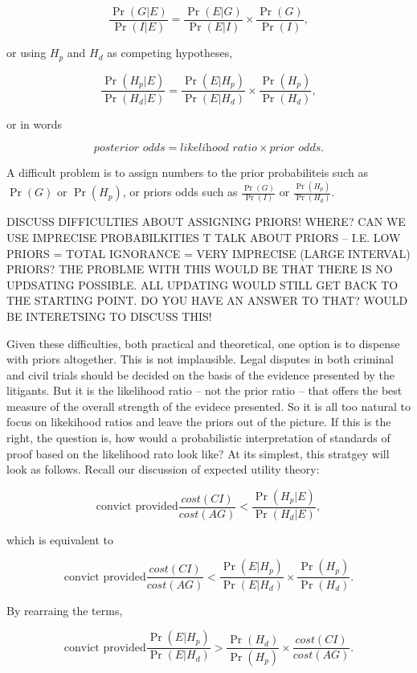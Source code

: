 \documentclass[10pt,dvipsnames,enabledeprecatedfontcommands]{scrartcl}
\begin{document}
\[ \frac{\Pr(G | E)}{\Pr(I | E)} = \frac{\Pr(E | G)}{\Pr(E | I)} \times \frac{\Pr(G)}{\Pr(I)},\]

or using \(H_p\) and \(H_d\) as competing hypotheses,

\[ \frac{\Pr(H_p | E)}{\Pr(H_d | E)} = \frac{\Pr(E | H_p)}{\Pr(E | H_d)} \times \frac{\Pr(H_p)}{\Pr(H_d)},\]

or in words

\[ \textit{posterior odds} = \textit{likelihood ratio} \times \textit{prior odds}.\]

A difficult problem is to assign numbers to the prior probabiliteis such
as \(\Pr(G)\) or \(\Pr(H_p)\), or priors odds such as
\(\frac{\Pr(G)}{\Pr(I)}\) or \(\frac{\Pr(H_p)}{\Pr(H_d)}\).

DISCUSS DIFFICULTIES ABOUT ASSIGNING PRIORS! WHERE? CAN WE USE IMPRECISE
PROBABILKITIES T TALK ABOUT PRIORS -- I.E. LOW PRIORS = TOTAL IGNORANCE
= VERY IMPRECISE (LARGE INTERVAL) PRIORS? THE PROBLME WITH THIS WOULD BE
THAT THERE IS NO UPDSATING POSSIBLE. ALL UPDATING WOULD STILL GET BACK
TO THE STARTING POINT. DO YOU HAVE AN ANSWER TO THAT? WOULD BE
INTERETSING TO DISCUSS THIS!

Given these difficulties, both practical and theoretical, one option is
to dispense with priors altogether. This is not implausible. Legal
disputes in both criminal and civil trials should be decided on the
basis of the evidence presented by the litigants. But it is the
likelihood ratio -- not the prior ratio -- that offers the best measure
of the overall strength of the evidece presented. So it is all too
natural to focus on likekihood ratios and leave the priors out of the
picture. If this is the right, the question is, how would a
probabilistic interpretation of standards of proof based on the
likelihood rato look like? At its simplest, this stratgey will look as
follows. Recall our discussion of expected utility theory:

\[ \text{convict provided}           \frac{cost(CI)}{cost(AG)} < \frac{\Pr(H_p | E)}{\Pr(H_d | E )}, \]

which is equivalent to

\[ \text{convict provided}           \frac{cost(CI)}{cost(AG)} < \frac{\Pr(E | H_p)}{\Pr(E | H_d)} \times \frac{\Pr(H_p)}{\Pr(H_d)}.\]

By rearraing the terms,

\[ \text{convict provided}  \frac{\Pr(E | H_p)}{\Pr(E | H_d)} > \frac{\Pr(H_d)}{\Pr(H_p)} \times     \frac{cost(CI)}{cost(AG)} .\]
\end{document}
